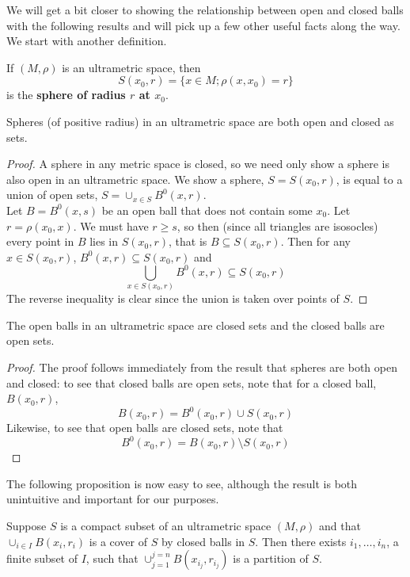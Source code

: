 We will get a bit closer to showing the relationship between open and closed balls with the following results and will pick up a few other useful facts along the way. We start with another definition.

\begin{definition}
	If $(M, \rho)$ is an ultrametric space, then \[S(x_0,r) = \{x \in M; \rho(x,x_0) =r \}\] is the \textbf{sphere of radius $r$ at $x_0$}.
\end{definition}

\begin{lemma}
 Spheres (of positive radius) in an ultrametric space are both open and closed as sets.
\end{lemma}

\begin{proof}
	A sphere in any metric space is closed, so we need only show a sphere is also open in an ultrametric space. We show a sphere, $S=S(x_0,r)$, is equal to a union of open sets, $S = \cup_{x\in S} B^0(x,r)$.\\
	
	Let $B=B^0(x,s)$ be an open ball that does not contain some $x_0$. Let $r=\rho(x_0,x)$. We must have $r \geq s$, so then (since all triangles are isosocles) every point in $B$ lies in $S(x_0,r)$, that is $B \subseteq S(x_0,r)$. Then for any $x \in S(x_0,r)$, $B^0(x,r) \subseteq S(x_0,r)$ and \[\bigcup_{x \in S(x_0,r)} B^0(x,r) \subseteq S(x_0,r)\] The reverse inequality is clear since the union is taken over points of $S$.
\end{proof}

\begin{proposition}
	The open balls in an ultrametric space are closed sets and the closed balls are open sets.
\end{proposition}

\begin{proof}
	The proof follows immediately from the result that spheres are both open and closed: to see that closed balls are open sets, note that for a closed ball, $B(x_0,r)$, \[B(x_0,r) = B^0(x_0,r) \cup S(x_0,r)\] Likewise, to see that open balls are closed sets, note that \[B^0(x_0,r) = B(x_0,r) \setminus S(x_0,r)\]
\end{proof}
The following proposition is now easy to see, although the result is both unintuitive and important for our purposes. \\

\begin{proposition}
Suppose $S$ is a compact subset of an ultrametric space $(M, \rho)$ and that $\cup_{i \in I} B(x_i,r_i)$ is a cover of $S$ by closed balls in $S$. Then there exists $i_1,\ldots, i_n$, a finite subset of $I$, such that  $\cup_{j=1}^{j=n} B(x_{i_j},r_{i_j})$ is a partition of $S$.
\end{proposition}

